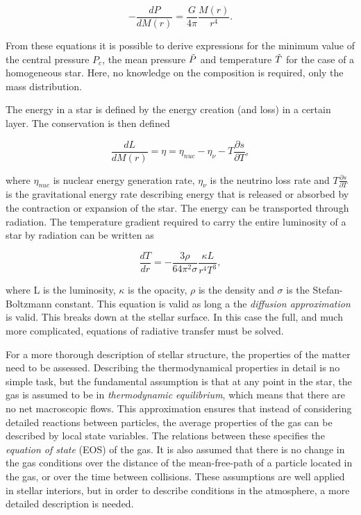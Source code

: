 \begin{equation}
    -\frac{dP}{dM(r)} = \frac{G}{4\pi}\frac{M(r)}{r^4}.
    \end{equation}

\noindent From these equations it is possible to derive expressions for the minimum value of the central pressure $P_c$, the mean pressure $\Tilde{P}$ and temperature $\Tilde{T}$ for the case of a homogeneous star. Here, no knowledge on the composition is required, only the mass distribution.

The energy in a star is defined by the energy creation (and loss)  in a certain layer. The conservation is then defined

\begin{equation}
     \frac{dL}{dM(r)} = \eta = \eta_{nuc} - \eta_{\nu} - T\frac{\partial s}{\partial T},
\end{equation} 

\noindent where $\eta_{nuc}$ is nuclear energy generation rate, $\eta_{\nu}$ is the neutrino loss rate and $T\frac{\partial s}{\partial T}$ is the gravitational energy rate describing energy that is released or absorbed by the contraction or expansion of the star. The energy can be transported through radiation. The temperature gradient required to carry the entire luminosity of a star by radiation can be written as 

\begin{equation}
	\frac{dT}{dr} = -\frac{3 \rho}{64\pi^2 \sigma }\frac{\kappa L}{r^4 T^3},
\end{equation}

\noindent where L is the luminosity, $\kappa$ is the opacity, $\rho$ is the density and $\sigma$ is the Stefan-Boltzmann constant. This equation is valid as long a the \textit{diffusion approximation} is valid. This breaks down at the stellar surface. In this case the full, and much more complicated, equations of radiative transfer must be solved.

For a more thorough description of stellar structure, the properties of the matter need to be assessed. Describing the thermodynamical properties in detail is no simple task, but the fundamental assumption is that at any point in the star, the gas is assumed to be in \textit{thermodynamic equilibrium}, which means that there are no net macroscopic flows. This approximation ensures that instead of considering detailed reactions between particles, the average properties of the gas can be described by local state variables. The relations between these specifies the \textit{equation of state} (EOS) of the gas. It is also assumed that there is no change in the gas conditions over the distance of the mean-free-path of a particle located in the gas, or over the time between collisions. These assumptions are well applied in stellar interiors, but in order to describe conditions in the atmosphere, a more detailed description is needed. 

